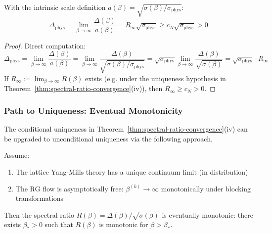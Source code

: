 \begin{corollary}
\label{cor:physical-gap}
With the intrinsic scale definition $a(\beta) = \sqrt{\sigma(\beta)/\sigma_{\text{phys}}}$:
\[
\Delta_{\text{phys}} = \lim_{\beta \to \infty} \frac{\Delta(\beta)}{a(\beta)} = R_\infty \sqrt{\sigma_{\text{phys}}} \geq c_N\sqrt{\sigma_{\text{phys}}} > 0
\]
\end{corollary}

\begin{proof}
Direct computation:
\[
\Delta_{\text{phys}} = \lim_{\beta \to \infty} \frac{\Delta(\beta)}{a(\beta)} 
= \lim_{\beta \to \infty} \frac{\Delta(\beta)}{\sqrt{\sigma(\beta)/\sigma_{\text{phys}}}}
= \sqrt{\sigma_{\text{phys}}} \lim_{\beta \to \infty} \frac{\Delta(\beta)}{\sqrt{\sigma(\beta)}}
= \sqrt{\sigma_{\text{phys}}} \cdot R_\infty
\]
If $R_\infty := \lim_{\beta \to \infty} R(\beta)$ exists (e.g. under the uniqueness hypothesis
in Theorem~\ref{thm:spectral-ratio-convergence}(iv)), then $R_\infty \geq c_N > 0$.
\end{proof}

\subsubsection{Path to Uniqueness: Eventual Monotonicity}
\label{subsubsec:eventual-monotonicity}

The conditional uniqueness in Theorem~\ref{thm:spectral-ratio-convergence}(iv) can be 
upgraded to unconditional uniqueness via the following approach.

\begin{theorem}
\label{thm:eventual-monotonicity}
Assume:
\begin{enumerate}[label=(\alph*)]
\item The lattice Yang-Mills theory has a unique continuum limit (in distribution)
\item The RG flow is asymptotically free: $\beta^{(k)} \to \infty$ monotonically under 
blocking transformations
\end{enumerate}
Then the spectral ratio $R(\beta) = \Delta(\beta)/\sqrt{\sigma(\beta)}$ is eventually 
monotonic: there exists $\beta_* > 0$ such that $R(\beta)$ is monotonic for $\beta > \beta_*$.
\end{theorem}

